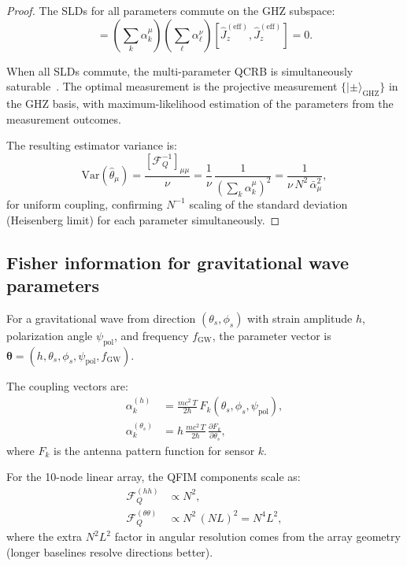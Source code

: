 \documentclass[aps,prl,twocolumn,superscriptaddress,showpacs]{revtex4-2}
\theoremstyle{definition}
\begin{document}
\begin{proof}
The SLDs for all parameters commute on the GHZ subspace:
\begin{equation}
[L_\mu, L_\nu] = \left(\sum_k\alpha_k^\mu\right)
\left(\sum_\ell\alpha_\ell^\nu\right)
[\hat{J}_z^{(\mathrm{eff})}, \hat{J}_z^{(\mathrm{eff})}] = 0.
\label{eq:sld-commute}
\end{equation}

When all SLDs commute, the multi-parameter QCRB is simultaneously
saturable~\cite{Ragy2016,Matsumoto2002}. The optimal measurement is the projective
measurement $\{|\pm\rangle_{\mathrm{GHZ}}\}$ in the GHZ basis, with
maximum-likelihood estimation of the parameters from the measurement
outcomes.

The resulting estimator variance is:
\begin{equation}
\mathrm{Var}(\hat{\theta}_\mu) = \frac{[\mathcal{F}_Q^{-1}]_{\mu\mu}}{\nu}
= \frac{1}{\nu}\,\frac{1}{\left(\sum_k\alpha_k^\mu\right)^2}
= \frac{1}{\nu\,N^2\,\bar{\alpha}_\mu^2},
\label{eq:saturated-variance}
\end{equation}
for uniform coupling, confirming $N^{-1}$ scaling of the standard
deviation (Heisenberg limit) for each parameter simultaneously.
\end{proof}

\subsection{Fisher information for gravitational wave parameters}

For a gravitational wave from direction $(\theta_s, \phi_s)$ with
strain amplitude $h$, polarization angle $\psi_{\mathrm{pol}}$, and
frequency $f_{\mathrm{GW}}$, the parameter vector is
$\boldsymbol{\theta} = (h, \theta_s, \phi_s, \psi_{\mathrm{pol}},
f_{\mathrm{GW}})$.

The coupling vectors are:
\begin{align}
\alpha_k^{(h)} &= \frac{mc^2\,T}{2\hbar}\,F_k(\theta_s,\phi_s,\psi_{\mathrm{pol}}),
\label{eq:alpha-h}\\
\alpha_k^{(\theta_s)} &= h\,\frac{mc^2\,T}{2\hbar}\,
\frac{\partial F_k}{\partial\theta_s},
\label{eq:alpha-theta}
\end{align}
where $F_k$ is the antenna pattern function for sensor $k$.

For the 10-node linear array, the QFIM components scale as:
\begin{align}
\mathcal{F}_Q^{(hh)} &\propto N^2, \label{eq:fq-hh}\\
\mathcal{F}_Q^{(\theta\theta)} &\propto N^2\,(NL)^2
= N^4 L^2, \label{eq:fq-tt}
\end{align}
where the extra $N^2L^2$ factor in angular resolution comes from the
array geometry (longer baselines resolve directions better).
\end{document}
